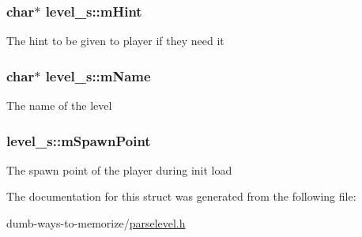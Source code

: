 \subsubsection[{\texorpdfstring{m\+Hint}{mHint}}]{\setlength{\rightskip}{0pt plus 5cm}char$\ast$ level\+\_\+s\+::m\+Hint}\hypertarget{structlevel__s_a9243daa853e29f529a7004ff134ee7e4}{}\label{structlevel__s_a9243daa853e29f529a7004ff134ee7e4}
The hint to be given to player if they need it 
\subsubsection[{\texorpdfstring{m\+Name}{mName}}]{\setlength{\rightskip}{0pt plus 5cm}char$\ast$ level\+\_\+s\+::m\+Name}\hypertarget{structlevel__s_a103166c16bb1f8aa50a13d3fd047fe03}{}\label{structlevel__s_a103166c16bb1f8aa50a13d3fd047fe03}
The name of the level 
\subsubsection[{\texorpdfstring{m\+Spawn\+Point}{mSpawnPoint}}]{ level\+\_\+s\+::m\+Spawn\+Point}\hypertarget{structlevel__s_a40b9aa1cc3812e64a8d357e732d9844b}{}\label{structlevel__s_a40b9aa1cc3812e64a8d357e732d9844b}
The spawn point of the player during init load 

The documentation for this struct was generated from the following file\+:\begin{DoxyCompactItemize}
\item 
dumb-\/ways-\/to-\/memorize/\hyperlink{parselevel_8h}{parselevel.\+h}\end{DoxyCompactItemize}
